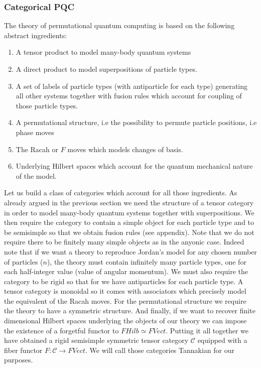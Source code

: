\documentclass{article}
\newcommand{\cat}{\mathcal{C}}
\begin{document}
\subsubsection{Categorical PQC}
The theory of permutational quantum computing is based on the following abstract ingredients:
\begin{enumerate}
	\item A tensor product to model many-body quantum systems
	\item A direct product to model superpositions of particle types.
	\item A set of labels of particle types (with antiparticle for each type) generating all other systems together with fusion rules which account for coupling of those particle types.
	\item A permutational structure, i.e the possibility to permute particle positions, i.e phase moves
	\item The Racah or $F$ moves which models changes of basis.
	\item Underlying Hilbert spaces which account for the quantum mechanical nature of the model.
\end{enumerate}
Let us build a class of categories which account for all those ingredients. As already argued in the previous section we need the structure of a tensor category in order to model many-body quantum systems together with superpositions. We then require the category to contain a simple object for each particle type and to be semisimple so that we obtain fusion rules (see appendix). Note that we do not require there to be finitely many simple objects as in the anyonic case. Indeed note that if we want a theory to reproduce Jordan's model for any chosen number of particles ($n$), the theory must contain infinitely many particle types, one for each half-integer value (value of angular momentum). We must also require the category to be rigid so that for we have antiparticles for each particle type. A tensor category is monoidal so it comes with associators which precisely model the equivalent of the Racah moves. For the permutational structure we require the theory to have a symmetric structure. And finally, if we want to recover finite dimensional Hilbert spaces underlying the objects of our theory we can impose the existence of a forgetful functor to $FHilb \simeq FVect$. Putting it all together we have obtained a rigid semisimple symmetric tensor category $\cat$ equipped with a fiber functor $F: \cat \rightarrow FVect$. We will call those categories Tannakian for our purposes.\\
\end{document}
